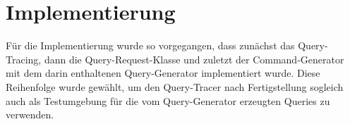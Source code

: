 \documentclass[11pt,toc=sectionentrywithoutdots, 
headheight=44pt, headings=optiontoheadandtoc, hyperfootnotes=false, hypertexnames=false]{scrartcl}
\begin{document}



\section{Implementierung}
Für die Implementierung wurde so vorgegangen, dass zunächst das Query-Tracing, dann die Query-Request-Klasse und zuletzt der Command-Generator mit dem darin enthaltenen Query-Generator implementiert wurde. Diese Reihenfolge wurde gewählt, um den Query-Tracer nach Fertigstellung sogleich auch als Testumgebung für die vom Query-Generator erzeugten Queries zu verwenden.
\end{document}
